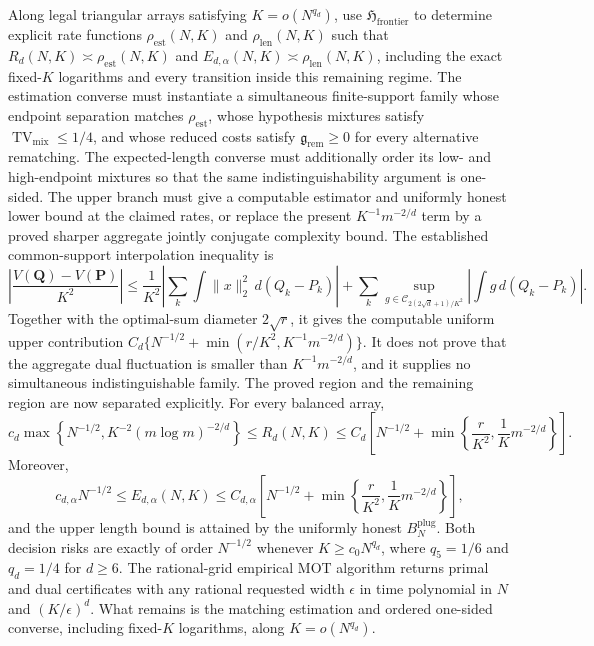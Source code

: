 Along legal triangular arrays satisfying \(K=o(N^{q_d})\), use \(\mathfrak H_{\mathrm{frontier}}\) to determine explicit rate functions \(\rho_{\mathrm{est}}(N,K)\) and \(\rho_{\mathrm{len}}(N,K)\) such that \(R_d(N,K)\asymp\rho_{\mathrm{est}}(N,K)\) and \(E_{d,\alpha}(N,K)\asymp\rho_{\mathrm{len}}(N,K)\), including the exact fixed-\(K\) logarithms and every transition inside this remaining regime. The estimation converse must instantiate a simultaneous finite-support family whose endpoint separation matches \(\rho_{\mathrm{est}}\), whose hypothesis mixtures satisfy \(\operatorname{TV}_{\mathrm{mix}}\le1/4\), and whose reduced costs satisfy \(\mathfrak g_{\mathrm{rem}}\ge0\) for every alternative rematching. The expected-length converse must additionally order its low- and high-endpoint mixtures so that the same indistinguishability argument is one-sided. The upper branch must give a computable estimator and uniformly honest lower bound at the claimed rates, or replace the present \(K^{-1}m^{-2/d}\) term by a proved sharper aggregate jointly conjugate complexity bound.
The established common-support interpolation inequality is
\[
\left|\frac{V(\mathbf Q)-V(\mathbf P)}{K^2}\right|
\le \frac1{K^2}\left|\sum_k\int\|x\|_2^2\,d(Q_k-P_k)\right|
+\sum_k\sup_{g\in\mathcal C_{2(2\sqrt d+1)/K^2}}
\left|\int g\,d(Q_k-P_k)\right|.
\]
Together with the optimal-sum diameter \(2\sqrt r\), it gives the computable uniform upper contribution \(C_d\{N^{-1/2}+\min(r/K^2,K^{-1}m^{-2/d})\}\). It does not prove that the aggregate dual fluctuation is smaller than \(K^{-1}m^{-2/d}\), and it supplies no simultaneous indistinguishable family.
The proved region and the remaining region are now separated explicitly. For every balanced array,
\[
c_d\max\left\{N^{-1/2},K^{-2}(m\log m)^{-2/d}\right\}
\le R_d(N,K)
\le C_d\left[N^{-1/2}+\min\left\{\frac r{K^2},\frac1K m^{-2/d}\right\}\right].
\]
Moreover,
\[
c_{d,\alpha}N^{-1/2}
\le E_{d,\alpha}(N,K)
\le C_{d,\alpha}\left[N^{-1/2}+\min\left\{\frac r{K^2},\frac1K m^{-2/d}\right\}\right],
\]
and the upper length bound is attained by the uniformly honest \(B_N^{\mathrm{plug}}\). Both decision risks are exactly of order \(N^{-1/2}\) whenever \(K\ge c_0N^{q_d}\), where \(q_5=1/6\) and \(q_d=1/4\) for \(d\ge6\). The rational-grid empirical MOT algorithm returns primal and dual certificates with any rational requested width \(\epsilon\) in time polynomial in \(N\) and \((K/\epsilon)^d\). What remains is the matching estimation and ordered one-sided converse, including fixed-\(K\) logarithms, along \(K=o(N^{q_d})\).
